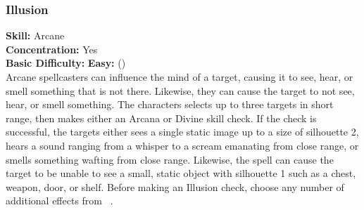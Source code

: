 \subsubsection{Illusion}
\textbf{Skill:} Arcane\\
\textbf{Concentration:} Yes\\
\textbf{Basic Difficulty:} \textbf{Easy:} (\difficulty)\\
Arcane spellcasters can influence the mind of a target, causing
it to see, hear, or smell something that is not there. Likewise, they can cause
the target to not see, hear, or smell something.  The characters selects up to
three targets in short range, then makes either an Arcana or Divine skill check.
If the check is successful, the targets either sees a single static image up to
a size of silhouette 2, hears a sound ranging from a whisper to a scream emanating
from close range, or smells something wafting from close range. Likewise, the spell
can cause the target to be unable to see a small, static object with silhouette 1
such as a chest, weapon, door, or shelf. Before making an Illusion check, choose
any number of additional effects from ~.

